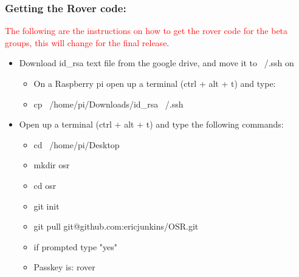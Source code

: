 \documentclass[12pt]{article}
\begin{document}
\subsubsection{Getting the Rover code:}
\textcolor{red}{The following are the instructions on how to get the rover code for the beta groups, this will change for the final release}. 
\begin{itemize}
	\item Download id\_rsa text file from the google drive, and move it to ~/.ssh on 
	\begin{itemize}
		\item On a Raspberry pi open up a terminal (ctrl + alt + t) and type: 
		\item cp ~/home/pi/Downloads/id\_rsa ~/.ssh	
	\end{itemize}
	\item Open up a terminal (ctrl + alt + t) and type the following commands:
	\begin{itemize}
		\item cd ~/home/pi/Desktop
		\item mkdir osr
		\item cd osr
		\item git init
		\item git pull git@github.com:ericjunkins/OSR.git
		\item if prompted type "yes"
		\item Passkey is: rover
	\end{itemize}

\end{itemize}
\end{document}
